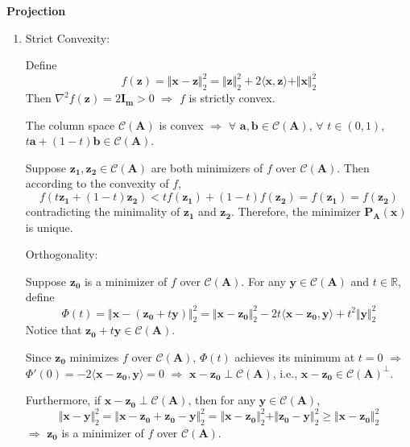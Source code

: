 \documentclass[11pt,letter,notitlepage]{article}
\newcommand{\proj}[2]{\textbf{P}_{#2} (#1)}
\begin{document}
\newpage

\begin{solution}\textbf{Projection}
\begin{enumerate}
	\item
	 Strict Convexity:

	Define
	$$f(\mathbf{z}) = \Vert \mathbf{x} - \mathbf{z} \Vert_2^2 = \Vert \mathbf{z} \Vert_2^2 + 2\langle \mathbf{x}, \mathbf{z} \rangle + \Vert \mathbf{x} \Vert_2^2$$
	Then $\nabla^2 f(\mathbf{z}) = 2 \mathbf{I_m} > 0$ $\Longrightarrow$ $f$ is strictly convex. 
	
	The column space $\mathcal{C}(\mathbf{A})$ is convex $\Longrightarrow$ $\forall$ $\mathbf{a}, \mathbf{b} \in \mathcal{C}(\mathbf{A})$, $\forall$ $t \in (0,1)$, $t\mathbf{a} + (1-t)\mathbf{b} \in \mathcal{C}(\mathbf{A})$. 
	
	Suppose $\mathbf{z_1}, \mathbf{z_2} \in \mathcal{C}(\mathbf{A})$ are both minimizers of $f$ over $\mathcal{C}(\mathbf{A})$. Then according to the convexity of $f$,
	\[
	f(t\mathbf{z_1} + (1-t)\mathbf{z_2}) < tf(\mathbf{z_1}) + (1-t)f(\mathbf{z_2}) = f(\mathbf{z_1}) = f(\mathbf{z_2})
	\]
	contradicting the minimality of $\mathbf{z_1}$ and $\mathbf{z_2}$. Therefore, the minimizer $\proj{\mathbf{x}}{\mathbf{A}}$ is unique.

	 Orthogonality:
	
	Suppose $\mathbf{z_0}$ is a minimizer of $f$ over $\mathcal{C}(\mathbf{A})$. For any $\mathbf{y} \in \mathcal{C}(\mathbf{A})$ and $t \in \mathbb{R}$, define
	$$\Phi(t) = \Vert \mathbf{x}-(\mathbf{z_0} + t\mathbf{y}) \Vert_2^2 = \Vert \mathbf{x} - \mathbf{z_0} \Vert_2^2 - 2t\langle\mathbf{x}-\mathbf{z_0}, \mathbf{y}\rangle + t^2 \Vert \mathbf{y} \Vert_2^2$$
	Notice that $\mathbf{z_0} + t\mathbf{y} \in \mathcal{C}(\mathbf{A})$.

	Since $\mathbf{z_0}$ minimizes $f$ over $\mathcal{C}(\mathbf{A})$, $\Phi(t)$ achieves its minimum at $t = 0$ $\Longrightarrow$ $\Phi'(0) = -2 \langle \mathbf{x} - \mathbf{z_0}, \mathbf{y} \rangle = 0$ $\Longrightarrow$ $\mathbf{x} - \mathbf{z_0} \perp \mathcal{C}(\mathbf{A})$, i.e., $\mathbf{x} - \mathbf{z_0} \in \mathcal{C}(\mathbf{A})^{\perp}$.

	Furthermore, if $\mathbf{x} - \mathbf{z_0} \perp \mathcal{C}(\mathbf{A})$, then for any $\mathbf{y} \in \mathcal{C}(\mathbf{A})$,
	\[
	\Vert \mathbf{x} - \mathbf{y} \Vert_2^2 = \Vert \mathbf{x} - \mathbf{z_0} + \mathbf{z_0} - \mathbf{y} \Vert_2^2 = \Vert \mathbf{x} - \mathbf{z_0} \Vert_2^2 + \Vert \mathbf{z_0} - \mathbf{y} \Vert_2^2 \geq \Vert \mathbf{x} - \mathbf{z_0} \Vert_2^2
	\]
	$\Longrightarrow$ $\mathbf{z_0}$ is a minimizer of $f$ over $\mathcal{C}(\mathbf{A})$.


\end{enumerate}
\end{solution}
\end{document}
